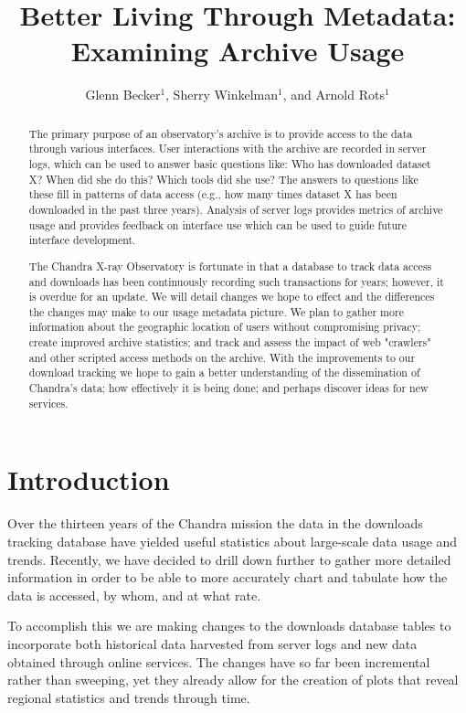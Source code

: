\documentclass[11pt,twoside]{article}
\begin{document}
\title{Better Living Through Metadata: Examining Archive Usage}
\author{Glenn Becker$^1$, Sherry Winkelman$^1$, and Arnold Rots$^1$}

\begin{abstract}
The primary purpose of an observatory's archive is to provide access to the data through 
various interfaces. User interactions with the archive are recorded in server logs, which 
can be used to answer basic questions like: Who has downloaded dataset X? When did she 
do this? Which tools did she use? The answers to questions like these fill in patterns 
of data access (e.g., how many times dataset X has been downloaded in the past three years). 
Analysis of server logs provides metrics of archive usage and provides feedback on interface 
use which can be used to guide future interface development.

The Chandra X-ray Observatory is fortunate in that a database to track data access and 
downloads has been continuously recording such transactions for years; however, it is 
overdue for an update. We will detail changes we hope to effect and the differences 
the changes may make to our usage metadata picture. We plan to gather more information 
about the geographic location of users without compromising privacy; create improved 
archive statistics; and track and assess the impact of web "crawlers" and other scripted 
access methods on the archive. With the improvements to our download tracking we hope to 
gain a better understanding of the dissemination of Chandra's data; how effectively it 
is being done; and perhaps discover ideas for new services.
\end{abstract}

\section{Introduction}

Over the thirteen years of the Chandra mission the data in the downloads tracking database 
have yielded useful statistics about large-scale data usage and trends. Recently, we have
decided to drill down further to gather more detailed information in order to be able to 
more accurately chart and tabulate how the data is accessed, by whom, and at what rate.

To accomplish this we are making changes to the downloads database tables to 
incorporate both historical data harvested from server logs and new data obtained through online
services. The changes have so far been incremental rather than sweeping, yet they already 
allow for the creation of plots that reveal regional statistics and trends through time.
\end{document}
